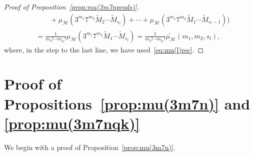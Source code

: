 \documentclass[11pt, a4paper]{article}
\newcommand{\calM}{\mathcal{M}}
\newcommand{\muM}{\mu_\calM}
\theoremstyle{plain}
\theoremstyle{definition}
\begin{document}
\begin{proof}[Proof of Proposition~\ref{prop:mu(3m7nprods)}]
\begin{align*}
  &\qquad + \muM(3^{m_1}7^{m_2} \widetilde{M}_{2} \cdots \widetilde{M}_{s_l})
  + \cdots + \muM(3^{m_1}7^{m_2} \widetilde{M}_{1} \cdots \widetilde{M}_{s_l-1})
  \Big) \\
  &= \frac{1}{m_3! \cdots m_{k_l}!} \muM(3^{m_1} 7^{m_2} \widetilde{M}_{1} \cdots \widetilde{M}_{s_l})
  = \frac{1}{m_3! \cdots m_{k_l}!} \widetilde{\muM}(m_1,m_2,s_l),
\end{align*}
where, in the step to the last line, we have used~\eqref{eq:mu(l)rec}.
\end{proof}

\section{Proof of Propositions~\ref{prop:mu(3m7n)} and \ref{prop:mu(3m7nqk)}}
\label{sec:mu(3m7n)}

We begin with a proof of Proposition~\ref{prop:mu(3m7n)}. 
\end{document}
